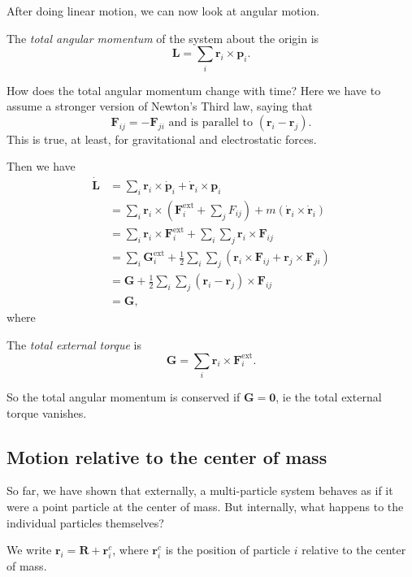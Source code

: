 \documentclass[a4paper]{article}
\begin{document}
After doing linear motion, we can now look at angular motion.
\begin{defi}
  The \emph{total angular momentum} of the system about the origin is
  \[
    \mathbf{L} = \sum_i \mathbf{r}_i \times \mathbf{p}_i.
  \]
\end{defi}
How does the total angular momentum change with time? Here we have to assume a stronger version of Newton's Third law, saying that
\[
  \mathbf{F}_{ij} = -\mathbf{F}_{ji}\text{ and is parallel to }(\mathbf{r}_i - \mathbf{r}_j).
\]
This is true, at least, for gravitational and electrostatic forces.

Then we have
\begin{align*}
  \dot{\mathbf{L}} &= \sum_i \mathbf{r}_i \times \dot{\mathbf{p}}_i + \dot{\mathbf{r}}_i \times \mathbf{p}_i\\
  &= \sum_i \mathbf{r}_i \times \left(\mathbf{F}_i^{\text{ext}} + \sum_j F_{ij}\right) + m(\dot{\mathbf{r}}_i\times \dot{\mathbf{r}}_i)\\
  &= \sum_i \mathbf{r}_i\times \mathbf{F}_i^{\text{ext}} + \sum_i \sum_j \mathbf{r}_i \times \mathbf{F}_{ij}\\
  &= \sum_i \mathbf{G}_i^{\text{ext}} + \frac{1}{2}\sum_i\sum_j (\mathbf{r}_i \times \mathbf{F}_{ij} + \mathbf{r}_j\times \mathbf{F}_{ji})\\
  &= \mathbf{G} + \frac{1}{2}\sum_i\sum_j(\mathbf{r}_i - \mathbf{r}_j)\times \mathbf{F}_{ij}\\
  &= \mathbf{G},
\end{align*}
where
\begin{defi}
  The \emph{total external torque} is
  \[
    \mathbf{G} = \sum_i \mathbf{r}_i \times \mathbf{F}_i^{\text{ext}}.
  \]
\end{defi}
So the total angular momentum is conserved if $\mathbf{G} = \mathbf{0}$, ie the total external torque vanishes.

\subsection{Motion relative to the center of mass}
So far, we have shown that externally, a multi-particle system behaves as if it were a point particle at the center of mass. But internally, what happens to the individual particles themselves?

We write $\mathbf{r}_i = \mathbf{R} + \mathbf{r}_i^c$, where $\mathbf{r}_i^c$ is the position of particle $i$ relative to the center of mass.
\end{document}
